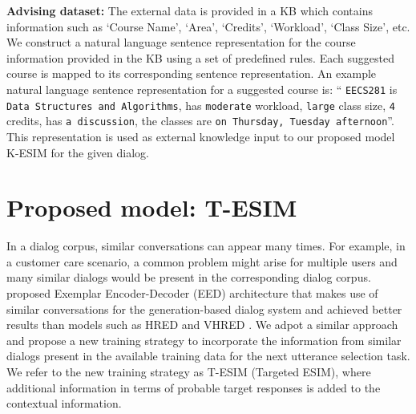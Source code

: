 \documentclass[letterpaper]{article} %
\begin{document}
\textbf{Advising dataset:} The external data is provided in a KB which contains information such as `Course Name', `Area', `Credits', `Workload', `Class Size', etc.
We construct a natural language sentence representation for the course information provided in the KB using a set of predefined rules.
Each suggested course is mapped to its corresponding sentence representation. An example natural language sentence representation for a suggested course is: `` \texttt{EECS281} is \texttt{Data Structures and Algorithms}, has \texttt{moderate} workload,  \texttt{large} class size, \texttt{4} credits, has \texttt{a discussion}, the classes are \texttt{on Thursday, Tuesday afternoon}''. This representation is used as external knowledge input to our proposed model K-ESIM for the given dialog.

\section{Proposed model: T-ESIM}
\label{proposed-model-t-esim}
In a dialog corpus, similar conversations can appear many times. For example, in a customer care scenario, a common problem might arise for multiple users and many similar dialogs would be present in the corresponding dialog corpus. \citeauthor{pandey2018exemplar}  proposed Exemplar Encoder-Decoder (EED) architecture that makes use of similar conversations for the generation-based dialog system and achieved better results than models such as HRED \cite{serban2016building} and VHRED \cite{serban2017hierarchical}. We adpot a similar approach and propose a new training strategy to incorporate the information from similar dialogs present in the available training data for the next utterance selection task. We refer to the new training strategy as T-ESIM (Targeted ESIM), where additional information in terms of probable target responses is added to the contextual information.
\end{document}
